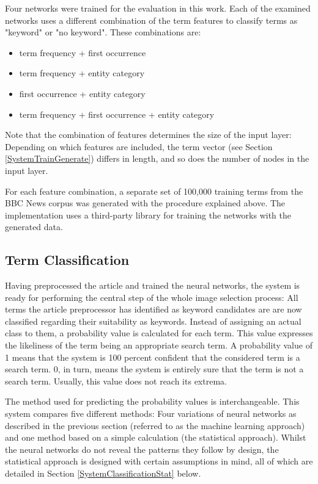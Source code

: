\documentclass[11pt,a4paper,twoside]{article}
\begin{document}
Four networks were trained for the evaluation in this work. Each of the examined networks uses a different combination of the term features to classify terms as "keyword" or "no keyword". These combinations are:

\vspace{-.5em}
\begin{itemize}
    \setlength\itemsep{0em}
    \item term frequency + first occurrence
    \item term frequency + entity category
    \item first occurrence + entity category
    \item term frequency + first occurrence + entity category
\end{itemize}
\vspace{-.5em}

\noindent Note that the combination of features determines the size of the input layer: Depending on which features are included, the term vector (see Section \ref{SystemTrainGenerate}) differs in length, and so does the number of nodes in the input layer.

For each feature combination, a separate set of 100,000 training terms from the BBC News corpus was generated with the procedure explained above. The implementation uses a third-party library \cite{BrainJSBrain.js:JavaScript} for training the networks with the generated data.

\subsection{Term Classification} \label{SystemClassification}

Having preprocessed the article and trained the neural networks, the system is ready for performing the central step of the whole image selection process: All terms the article preprocessor has identified as keyword candidates are are now classified regarding their suitability as keywords. Instead of assigning an actual class to them, a probability value is calculated for each term. This value expresses the likeliness of the term being an appropriate search term. A probability value of 1 means that the system is 100 percent confident that the considered term is a search term. 0, in turn, means the system is entirely sure that the term is not a search term. Usually, this value does not reach its extrema.

The method used for predicting the probability values is interchangeable. This system compares five different methods: Four variations of neural networks as described in the previous section (referred to as the machine learning approach) and one method based on a simple calculation (the statistical approach). Whilst the neural networks do not reveal the patterns they follow by design, the statistical approach is designed with certain assumptions in mind, all of which are detailed in Section \ref{SystemClassificationStat} below. 
\end{document}
